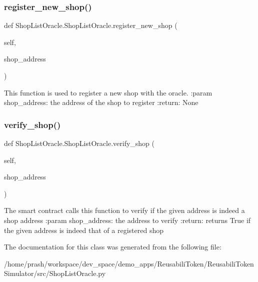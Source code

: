 \subsubsection{\texorpdfstring{register\+\_\+new\+\_\+shop()}{register\_new\_shop()}}
{\footnotesize\ttfamily def Shop\+List\+Oracle.\+Shop\+List\+Oracle.\+register\+\_\+new\+\_\+shop (\begin{DoxyParamCaption}\item[{}]{self,  }\item[{}]{shop\+\_\+address }\end{DoxyParamCaption})}

\begin{DoxyVerb}This function is used to register a new shop with the oracle.
:param shop_address: the address of the shop to register
:return: None
\end{DoxyVerb}
 \mbox{\label{class_shop_list_oracle_1_1_shop_list_oracle_a82a22c3a5075c86d96e6e2338840309c}} 
\subsubsection{\texorpdfstring{verify\+\_\+shop()}{verify\_shop()}}
{\footnotesize\ttfamily def Shop\+List\+Oracle.\+Shop\+List\+Oracle.\+verify\+\_\+shop (\begin{DoxyParamCaption}\item[{}]{self,  }\item[{}]{shop\+\_\+address }\end{DoxyParamCaption})}

\begin{DoxyVerb}The smart contract calls this function to verify if the given address is indeed a shop address
:param shop_address: the address to verify
:return: returns True if the given address is indeed that of a registered shop
\end{DoxyVerb}
 

The documentation for this class was generated from the following file\+:\begin{DoxyCompactItemize}
\item 
/home/prash/workspace/dev\+\_\+space/demo\+\_\+apps/\+Reusabili\+Token/\+Reusabili\+Token\+Simulator/src/Shop\+List\+Oracle.\+py\end{DoxyCompactItemize}
